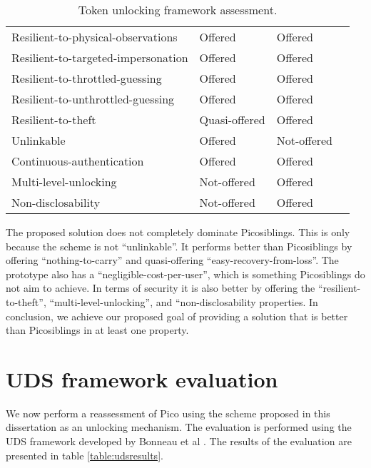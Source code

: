 \begin{table}
\begin{tabular}{l|l|l|l}
    Resilient-to-physical-observations  & \cellcolor{green!25}Offered       	& \cellcolor{green!25}Offered          	\\
    Resilient-to-targeted-impersonation & \cellcolor{green!25}Offered       	& \cellcolor{green!25}Offered      		\\
    Resilient-to-throttled-guessing     & \cellcolor{green!25}Offered       	& \cellcolor{green!25}Offered          	\\
    Resilient-to-unthrottled-guessing   & \cellcolor{green!25}Offered       	& \cellcolor{green!25}Offered          	\\
    Resilient-to-theft                  & \cellcolor{yellow!25}Quasi-offered   	& \cellcolor{green!25}Offered          	\\
    Unlinkable                          & \cellcolor{green!25}Offered       	& \cellcolor{red!25}Not-offered      	\\
    Continuous-authentication           & \cellcolor{green!25}Offered       	& \cellcolor{green!25}Offered      		\\
    Multi-level-unlocking               & \cellcolor{red!25}Not-offered   		& \cellcolor{green!25}Offered      		\\
    Non-disclosability                  & \cellcolor{red!25}Not-offered   		& \cellcolor{green!25}Offered    		\\
    \end{tabular}

	\caption{Token unlocking framework assessment.}
	\label{table:tokenresults}

\end{table}

The proposed solution does not completely dominate Picosiblings. This is only because the scheme is not ``unlinkable''. It performs better than Picosiblings by offering ``nothing-to-carry'' and quasi-offering ``easy-recovery-from-loss''. The prototype also has a ``negligible-cost-per-user'', which is something Picosiblings do not aim to achieve. In terms of security it is also better by offering the ``resilient-to-theft'', ``multi-level-unlocking'', and ``non-disclosability properties. In conclusion, we achieve our proposed goal of providing a solution that is better than Picosiblings in at least one property.

\section{UDS framework evaluation}
We now perform a reassessment of Pico using the scheme proposed in this dissertation as an unlocking mechanism. The evaluation is performed using the UDS framework developed by Bonneau et al \cite{bonneau2012quest}. The results of the evaluation are presented in table \ref{table:udsresults}.

